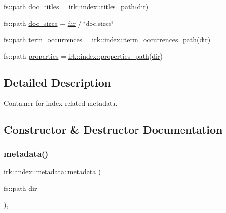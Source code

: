 \begin{DoxyCompactItemize}
\item 
fs\+::path \mbox{\hyperlink{structirk_1_1index_1_1metadata_aae05b9d0a33fd6c90f7f9be0a359ca77}{doc\+\_\+titles}} = \mbox{\hyperlink{namespaceirk_1_1index_a199554d3966dc8c076fc6c0c8d141784}{irk\+::index\+::titles\+\_\+path}}(\mbox{\hyperlink{structirk_1_1index_1_1metadata_a355b4325c022cd152e68fc18b1775fc6}{dir}})
\item 
fs\+::path \mbox{\hyperlink{structirk_1_1index_1_1metadata_a7aa4d97e4e11c582380ad03e18eb62bb}{doc\+\_\+sizes}} = \mbox{\hyperlink{structirk_1_1index_1_1metadata_a355b4325c022cd152e68fc18b1775fc6}{dir}} / \char`\"{}doc.\+sizes\char`\"{}
\item 
fs\+::path \mbox{\hyperlink{structirk_1_1index_1_1metadata_a9abaf09f8e29f9be71171242db8839ec}{term\+\_\+occurrences}} = \mbox{\hyperlink{namespaceirk_1_1index_ae4bdbf4ec595e47df214a7b1bea0a4b9}{irk\+::index\+::term\+\_\+occurrences\+\_\+path}}(\mbox{\hyperlink{structirk_1_1index_1_1metadata_a355b4325c022cd152e68fc18b1775fc6}{dir}})
\item 
fs\+::path \mbox{\hyperlink{structirk_1_1index_1_1metadata_a1501ec5d527da04b74af747230504ee0}{properties}} = \mbox{\hyperlink{namespaceirk_1_1index_a1d229aa9c1efde2164015640a052886b}{irk\+::index\+::properties\+\_\+path}}(\mbox{\hyperlink{structirk_1_1index_1_1metadata_a355b4325c022cd152e68fc18b1775fc6}{dir}})
\end{DoxyCompactItemize}


\subsection{Detailed Description}
Container for index-\/related metadata. 

\subsection{Constructor \& Destructor Documentation}
\mbox{\label{structirk_1_1index_1_1metadata_a9d0e997a5145a95328519290af96326c}} 
\subsubsection{\texorpdfstring{metadata()}{metadata()}}
{\footnotesize\ttfamily irk\+::index\+::metadata\+::metadata (\begin{DoxyParamCaption}\item[{fs\+::path}]{dir }\end{DoxyParamCaption})\hspace{0.3cm}{\ttfamily [inline]}, {\ttfamily [explicit]}}



